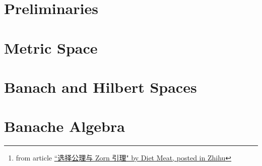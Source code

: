 \documentclass[10pt, a4paper]{article}
\begin{document}
\begin{abstract}
However, most of the Statistics undergraduate in BNU-HKBU United International College did not take the course of real analysis, only basic Multivariate Calculus, thus, there are multiple preliminary's knowledge missing. In this note, I am trying to fill the gap by covering the missing chapters and I highly recommend those students who enrol this course spend some time on Mathematical Analysis and Real Analysis, also, take some time to do the revision on Linear Algebra.

As a guide, the notes and exercises have been marked as follows:

\begin{enumerate}
    \item[$\blacktriangleright$] refers to important notes and results, also , \uline{underline} or \hl{hightlight}.
    \item[$*$] more advanced or difficult exercises that can be skipped on a first reading;
    \item[$\diamondsuit$] side remarks that can be skipped without losing any essential ideas
\end{enumerate}

\noindent``数学当中最麻烦的事情就是显然，我觉得显然，你觉得不显然这就是最麻烦的事情了” - ``Trivial is the biggest problem in mathematics". \footnote{from article \href{https://zhuanlan.zhihu.com/p/38029151}{``选择公理与 Zorn 引理" by Diet Meat, posted in Zhihu}}

\end{abstract}

\newpage 

\begin{multicols}{2}
\tableofcontents 
\listoftheorems[ignoreall,show=definition]
\end{multicols}

\newpage

\part{Preliminaries}



\part{Metric Space}



\part{Banach and Hilbert Spaces}


\part{Banache Algebra}


\newpage




\end{document}
